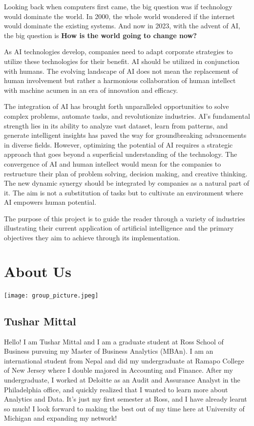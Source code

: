 \documentclass[
]{article}
\begin{document}
Looking back when computers first came, the big question was if technology would dominate the world. In 2000, the whole world wondered if the internet would dominate the existing systems. And now in 2023, with the advent of AI, the big question is \textbf{How is the world going to change now?}

As AI technologies develop, companies need to adapt corporate strategies to utilize these technologies for their benefit. AI should be utilized in conjunction with humans. The evolving landscape of AI does not mean the replacement of human involvement but rather a harmonious collaboration of human intellect with machine acumen in an era of innovation and efficacy.

The integration of AI has brought forth unparalleled opportunities to solve complex problems, automate tasks, and revolutionize industries. AI's fundamental strength lies in its ability to analyze vast dataset, learn from patterns, and generate intelligent insights has paved the way for groundbreaking advancements in diverse fields. However, optimizing the potential of AI requires a strategic approach that goes beyond a superficial understanding of the technology.
The convergence of AI and human intellect would mean for the companies to restructure their plan of problem solving, decision making, and creative thinking. The new dynamic synergy should be integrated by companies as a natural part of it. The aim is not a substitution of tasks but to cultivate an environment where AI empowers human potential.

The purpose of this project is to guide the reader through a variety of industries illustrating their current application of artificial intelligence and the primary objectives they aim to achieve through its implementation.

\hypertarget{about-us}{%
\section{About Us}\label{about-us}}

\texttt{[image: group\_picture.jpeg]}

\hypertarget{tushar-mittal}{%
\subsection{Tushar Mittal}\label{tushar-mittal}}

Hello!
I am Tushar Mittal and I am a graduate student at Ross School of Business pursuing my Master of Business Analytics (MBAn). I am an international student from Nepal and did my undergraduate at Ramapo College of New Jersey where I double majored in Accounting and Finance. After my undergraduate, I worked at Deloitte as an Audit and Assurance Analyst in the Philadelphia office, and quickly realized that I wanted to learn more about Analytics and Data. It's just my first semester at Ross, and I have already learnt so much! I look forward to making the best out of my time here at University of Michigan and expanding my network!
\end{document}
